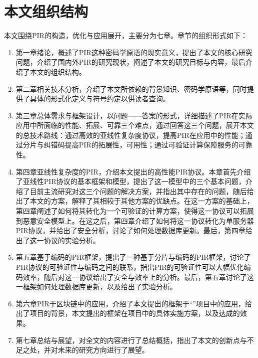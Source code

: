 \section{本文组织结构}

本文围绕PIR的构造，优化与应用展开，主要分为七章。章节的组织形式如下：
\begin{enumerate}
    \item 第一章绪论，概述了PIR这种密码学原语的现实意义，提出了本文的核心研究问题，介绍了国内外PIR的研究现状，阐述了本文的研究目标与内容，最后介绍了本文的组织结构。
    \item 第二章相关技术分析，介绍了本文所依赖的背景知识、密码学原语等，同时提供了具体的形式化定义与符号约定以供读者查询。
    \item 第三章总体需求与框架设计，以问题——答案的形式，详细描述了PIR在实际应用中所面临的性能、拓展、可靠三个难点，通过回答这三个问题，展开本文的总技术路线：通过高效的亚线性复杂度协议，提高PIR在应用中的性能；通过分片与纠错码提高PIR的拓展性，可用性；通过可验证计算保障服务的可靠性。
    \item 第四章亚线性复杂度的PIR，介绍本文提出的高性能PIR协议。本章首先介绍了亚线性PIR协议的基本框架和模型，提出了这一模型中的三个基本问题，介绍了目前主流研究对这三个问题的解决方案，并指出其中存在的问题，随后给出了本文的方案，解释了其相较于其他方案的优缺点。在这一方案的基础上，第四章阐述了如何将其转化为一个可验证的计算方案，使得这一协议可以拓展到恶意安全模型上。在这之后，第四章介绍了如何将这一协议转化为单服务器PIR协议，并给出了安全分析，讨论了如何处理数据库更新。最后，第四章给出了这一协议的实验分析。
    \item 第五章基于编码的PIR框架，提出了一种基于分片与编码的PIR框架，讨论了PIR协议的可验证性与编码之间的联系，指出PIR的可验证性可以大幅优化编码效率，随后对这一协议给出了安全与效率上的分析。最后，第五章讨论了这一框架如何处理数据库更新，以及给出了实验分析。
    \item 第六章PIR于区块链中的应用，介绍了本文提出的框架于“\projectname”项目中的应用，给出了项目的背景，本文提出的框架在项目中的具体实施方案，以及达成的效果。
    \item 第七章总结与展望，对全文的内容进行了总结概括，指出了本文的创新点与不足之处，并对未来的研究方向进行了展望。
\end{enumerate}